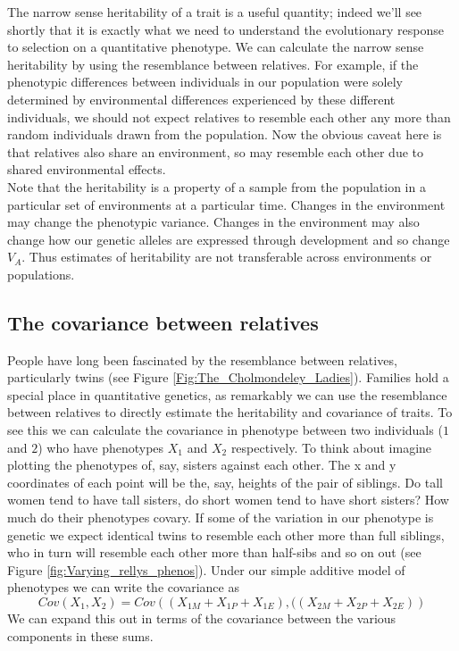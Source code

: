 The narrow sense heritability of a trait is a useful quantity; indeed
we'll see shortly that it is exactly what we need to understand the
evolutionary response to selection on a quantitative phenotype. We can
calculate the narrow sense heritability by using the resemblance between
relatives. For example, if the phenotypic differences between individuals in our population were solely determined by environmental differences experienced by these different individuals, we
should not expect relatives to resemble each other any more than random
individuals drawn from the population. Now the obvious caveat here is
that relatives also share an environment, so may resemble each other
due to shared environmental effects. \\

Note that the heritability is a property of a sample from the population in a particular set of environments at a particular time. Changes in the environment may change the phenotypic variance. Changes in the environment may also change how our genetic alleles are expressed through development and so change $V_A$. Thus estimates of heritability are not transferable across environments or populations. 



 
\subsection{The covariance between relatives}
People have long been fascinated by the resemblance between relatives,
particularly twins (see Figure
\ref{Fig:The_Cholmondeley_Ladies}). Families hold a special place in
quantitative genetics, as remarkably we can use the
resemblance between relatives to directly estimate the heritability
and covariance of traits. To see this we can calculate the covariance in phenotype between two individuals
($1$ and $2$) who have phenotypes $X_1$ and $X_2$
respectively. To
think about imagine plotting the phenotypes of, say, sisters against
each other. The x and y coordinates of each point will be the, say,
heights of the pair of siblings. Do tall women tend to have tall
sisters, do short women tend to have short sisters? How much do their
phenotypes covary. If some of the variation in our phenotype is
genetic we expect identical twins to resemble each other more than
full siblings, who in turn will resemble each other more than
half-sibs and so on out (see Figure \ref{fig:Varying_rellys_phenos}). Under our simple additive model of phenotypes we
can write the covariance as 
\begin{equation}
Cov(X_1,X_2) =
Cov\left((X_{1M}+X_{1P}+X_{1E}),((X_{2M}+X_{2P}+X_{2E}) \right)
\end{equation}
We can expand this out in terms of the covariance between the various
components in these sums.\\

